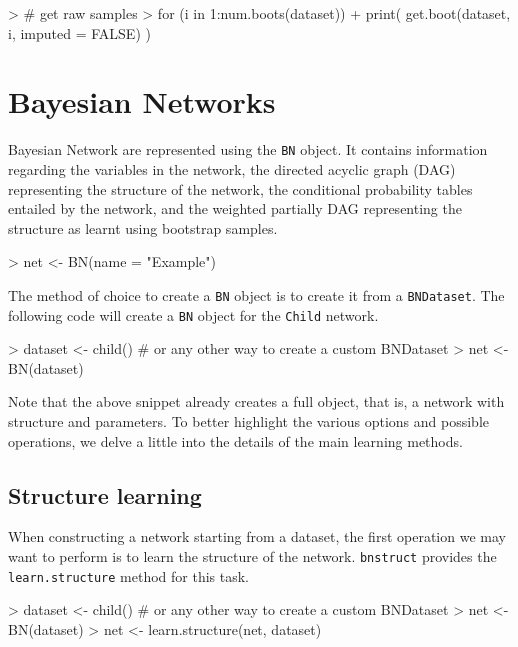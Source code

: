 \documentclass{article}
\newcommand{\Robject}[1]{{\texttt{#1}}}
\newcommand{\Rpackage}[1]{{\texttt{#1}}}
\newcommand{\Rmethod}[1]{{\texttt{#1}}}
\begin{document}
\begin{Schunk}
\begin{Sinput}
> # get raw samples
> for (i in 1:num.boots(dataset))
+   print( get.boot(dataset, i, imputed = FALSE) )
\end{Sinput}
\end{Schunk}


\section{Bayesian Networks}
Bayesian Network are represented using the \Robject{BN} object. It contains information regarding the variables in the network,
the directed acyclic graph (DAG) representing the structure of the network, the conditional probability tables entailed by 
the network, and the weighted partially DAG representing the structure as learnt using bootstrap samples.

\begin{Schunk}
\begin{Sinput}
> net <- BN(name = "Example")
\end{Sinput}
\end{Schunk}


The method of choice to create a \Robject{BN} object is to create it from a \Robject{BNDataset}.
The following code will create a \Robject{BN} object for the \texttt{Child} network.
\begin{Schunk}
\begin{Sinput}
> dataset <- child() # or any other way to create a custom BNDataset
> net     <- BN(dataset)
\end{Sinput}
\end{Schunk}

Note that the above snippet already creates a full object, that is, a network with structure and parameters.
To better highlight the various options and possible operations, we delve a little into the details
of the main learning methods.

\subsection{Structure learning}
When constructing a network starting from a dataset, the first operation we may want to perform is to learn
the structure of the network. \Rpackage{bnstruct} provides the \Rmethod{learn.structure} method for this task.
\begin{Schunk}
\begin{Sinput}
> dataset <- child() # or any other way to create a custom BNDataset
> net     <- BN(dataset)
> net     <- learn.structure(net, dataset)
\end{Sinput}
\end{Schunk}
\end{document}
